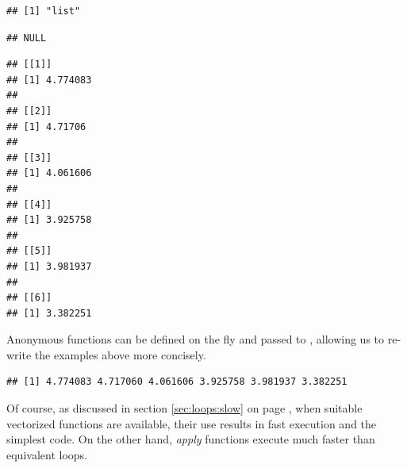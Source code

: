 \documentclass[krantz2]{krantz}\usepackage{knitr}%
\begin{document}
\begin{knitrout}\footnotesize
{}\color{fgcolor}\begin{kframe}
\begin{alltt}
 \hlkwb{<-} \hlstd{(}     \hlstd{=} \hlstd{,}  \hlstd{=} \hlstd{)}
\end{alltt}
\begin{verbatim}
## [1] "list"
\end{verbatim}
\begin{alltt}
\end{alltt}
\begin{verbatim}
## NULL
\end{verbatim}
\begin{alltt}
\end{alltt}
\begin{verbatim}
## [[1]]
## [1] 4.774083
## 
## [[2]]
## [1] 4.71706
## 
## [[3]]
## [1] 4.061606
## 
## [[4]]
## [1] 3.925758
## 
## [[5]]
## [1] 3.981937
## 
## [[6]]
## [1] 3.382251
\end{verbatim}
\end{kframe}
\end{knitrout}

Anonymous functions can be defined on the fly and passed to , allowing us to re-write the examples above more concisely.
\begin{knitrout}\footnotesize
{}\color{fgcolor}\begin{kframe}
\begin{alltt}
\hlstd{(}   \hlstd{=} \hlstd{(}\hlstd{,} \hlstd{) \{} \hlopt{+}   \hlstd{=} \hlstd{)}
\end{alltt}
\begin{verbatim}
## [1] 4.774083 4.717060 4.061606 3.925758 3.981937 3.382251
\end{verbatim}
\end{kframe}
\end{knitrout}

Of course, as discussed in section \ref{sec:loops:slow} on page \pageref{sec:loops:slow}, when suitable vectorized functions are available, their use results in fast execution and the simplest code. On the other hand, \emph{apply} functions execute much faster than equivalent  loops.
\end{document}
